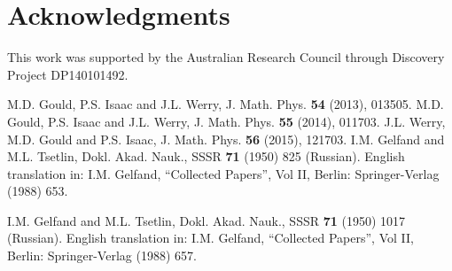 \documentclass[12pt]{article}
\begin{document}
%
%
%
\section*{Acknowledgments}
%
This work was supported by the Australian Research Council through Discovery Project
DP140101492. 
%
%
%
%
%

\newpage
\begin{thebibliography}{10}

%
%
% 
 M.D. Gould, P.S. Isaac and J.L. Werry, J. Math. Phys. {\bf 54} (2013), 013505.
% 
 M.D. Gould, P.S. Isaac and J.L. Werry, J. Math. Phys. {\bf 55} (2014), 011703.
%
 J.L. Werry, M.D. Gould and P.S. Isaac, J. Math. Phys. {\bf 56} (2015), 121703.
% 
%  
%
% 
%  
%  
I.M. Gelfand and M.L. Tsetlin, Dokl. Akad. Nauk., SSSR {\bf 71} (1950) 825 (Russian).
English translation in: I.M. Gelfand, ``Collected Papers'', Vol II, Berlin:
Springer-Verlag (1988) 653.
  
I.M. Gelfand and M.L. Tsetlin, Dokl. Akad. Nauk., SSSR {\bf 71} (1950) 1017 (Russian).
English translation in: I.M. Gelfand, ``Collected Papers'', Vol II, Berlin:
Springer-Verlag (1988) 657.
  

\end{thebibliography}
\end{document}
